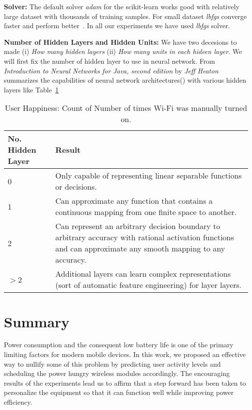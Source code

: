 \textbf{Solver:} The default solver \textit{adam} for the scikit-learn works good with relatively large dataset with thousands of training samples. For small dataset \textit{lbfgs} converge faster and perform better~\cite{scite_learn_framework}. In all our experiments we have used \textit{lbfgs} solver.

\textbf{Number of Hidden Layers and Hidden Units:} We have two decesions to made (i) \textit{How many hidden layers} (ii) \textit{How many units in each hideen layer}. We will first fix the number of hidden layer to use in neural network. From \textit{Introduction to Neural Networks for Java, second edition} by \textit{Jeff Heaton} summarizes the capabilities of neural network architectures(\cite{hilton_web_archive}) with various hidden layers like Table~\ref{tab:no_hdn_layer}
\begin{table}[h]

\centering

\begin{tabular}{|m{1.3cm}| m{12.0cm}|}
\hline
\bf No. Hidden Layer & \bf Result \\
\hline
0 & Only capable of representing linear separable functions or decisions. \\
\hline
1 & Can approximate any function that contains a continuous mapping from one finite space to another. \\
\hline
2 & Can represent an arbitrary decision boundary to arbitrary accuracy with rational activation functions and can approximate any smooth mapping to any accuracy. \\
\hline
$>$2 & Additional layers can learn complex representations (sort of automatic feature engineering) for layer layers. \\
\hline
\end{tabular}

\caption{User Happiness: Count of Number of times Wi-Fi was manually turned on.}
\label{tab:no_hdn_layer}

\end{table}

\section{Summary}
Power consumption and the consequent low battery life is one of the primary limiting factors for modern mobile devices.
In this work, we proposed an effective way to nullify some of this problem by predicting user activity levels and scheduling
the power hungry wireless modules accordingly. The encouraging results of the experiments lead us to affirm that a step
forward has been taken to personalize the equipment so that it can function well while improving power efficiency.

